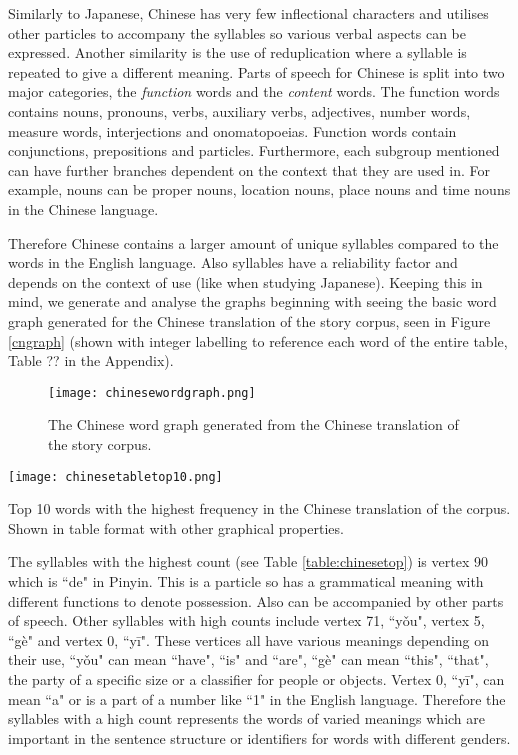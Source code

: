 Similarly to Japanese, Chinese has very few inflectional characters and utilises other particles to accompany the syllables so various verbal aspects can be expressed. Another similarity is the use of reduplication where a syllable is repeated to give a different meaning. Parts of speech for Chinese is split into two major categories, the \emph{function} words and the \emph{content} words. The function words contains nouns, pronouns, verbs, auxiliary verbs, adjectives, number words, measure words, interjections and onomatopoeias. Function words contain conjunctions, prepositions and particles. Furthermore, each subgroup mentioned can have further branches dependent on the context that they are used in. For example, nouns can be proper nouns, location nouns, place nouns and time nouns in the Chinese language.

Therefore Chinese contains a larger amount of unique syllables compared to the words in the English language. Also syllables have a reliability factor and depends on the context of use (like when studying Japanese). Keeping this in mind, we generate and analyse the graphs beginning with seeing the basic word graph generated for the Chinese translation of the story corpus, seen in Figure \ref{cngraph} (shown with integer labelling to reference each word of the entire table, Table ?? in the Appendix).

\begin{figure}[H]
\centering
\texttt{[image: chinesewordgraph.png]}
\caption{The Chinese word graph generated from the Chinese translation of the story corpus.}
\label{fig:cngraph}
\end{figure}

\begin{table}[H]
\centering
\texttt{[image: chinesetabletop10.png]}
\caption{Top 10 words with the highest frequency in the Chinese translation of the corpus. Shown in table format with other graphical properties. }
\label{table:chinesetop}
\end{table}

The syllables with the highest count (see Table \ref{table:chinesetop}) is vertex 90 which is ``de" in Pinyin. This is a particle so has a grammatical meaning with different functions to denote possession. Also can be accompanied by other parts of speech. Other syllables with high counts include vertex 71, ``yǒu", vertex 5, ``gè" and vertex 0, ``yī". These vertices all have various meanings depending on their use, ``yǒu" can mean ``have", ``is" and ``are", ``gè" can mean ``this", ``that", the party of a specific size or a classifier for people or objects. Vertex 0, ``yī", can mean ``a" or is a part of a number like ``1" in the English language. Therefore the syllables with a high count represents the words of varied meanings which are important in the sentence structure or identifiers for words with different genders.


